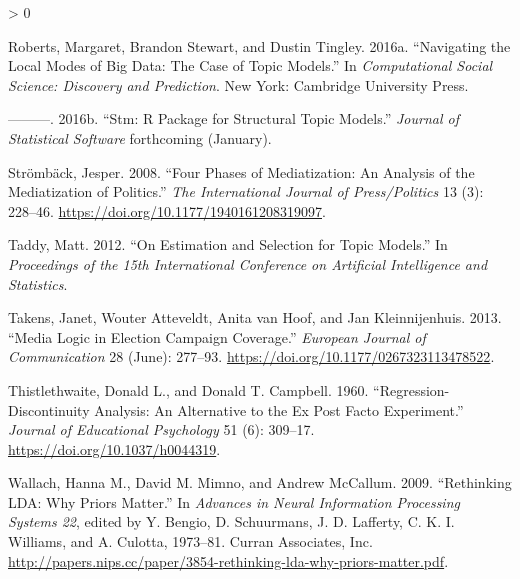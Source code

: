 \documentclass[
]{article}
\newlength{\cslhangindent}
\newenvironment{CSLReferences}[2] %
 {%
  \setlength{\parindent}{0pt}
  \ifodd #1 \everypar{\setlength{\hangindent}{\cslhangindent}}\ignorespaces\fi
  \ifnum #2 > 0
  \setlength{\parskip}{#2\baselineskip}
  \fi
 }%
 {}
\begin{document}
\begin{CSLReferences}{1}{0}
\leavevmode\hypertarget{ref-roberts_navigating_2016}{}%
Roberts, Margaret, Brandon Stewart, and Dustin Tingley. 2016a.
{``Navigating the Local Modes of Big Data: The Case of Topic Models.''}
In \emph{Computational Social Science: Discovery and Prediction}. New
York: Cambridge University Press.

\leavevmode\hypertarget{ref-roberts_stm:_2016}{}%
---------. 2016b. {``Stm: R Package for Structural Topic Models.''}
\emph{Journal of Statistical Software} forthcoming (January).

\leavevmode\hypertarget{ref-stromback_four_2008}{}%
Strömbäck, Jesper. 2008. {``Four Phases of Mediatization: An Analysis of
the Mediatization of Politics.''} \emph{The International Journal of
Press/Politics} 13 (3): 228--46.
\url{https://doi.org/10.1177/1940161208319097}.

\leavevmode\hypertarget{ref-taddy_estimation_2012}{}%
Taddy, Matt. 2012. {``On Estimation and Selection for Topic Models.''}
In \emph{Proceedings of the 15th International Conference on Artificial
Intelligence and Statistics}.

\leavevmode\hypertarget{ref-takens_media_2013}{}%
Takens, Janet, Wouter Atteveldt, Anita van Hoof, and Jan Kleinnijenhuis.
2013. {``Media Logic in Election Campaign Coverage.''} \emph{European
Journal of Communication} 28 (June): 277--93.
\url{https://doi.org/10.1177/0267323113478522}.

\leavevmode\hypertarget{ref-thistlethwaite_regression-discontinuity_1960}{}%
Thistlethwaite, Donald L., and Donald T. Campbell. 1960.
{``Regression-Discontinuity Analysis: An Alternative to the Ex Post
Facto Experiment.''} \emph{Journal of Educational Psychology} 51 (6):
309--17. \url{https://doi.org/10.1037/h0044319}.

\leavevmode\hypertarget{ref-wallach_rethinking_2009}{}%
Wallach, Hanna M., David M. Mimno, and Andrew McCallum. 2009.
{``Rethinking {LDA}: Why Priors Matter.''} In \emph{Advances in Neural
Information Processing Systems 22}, edited by Y. Bengio, D. Schuurmans,
J. D. Lafferty, C. K. I. Williams, and A. Culotta, 1973--81. Curran
Associates, Inc.
\url{http://papers.nips.cc/paper/3854-rethinking-lda-why-priors-matter.pdf}.

\end{CSLReferences}
\end{document}
